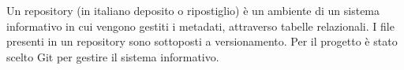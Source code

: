 

{Un repository (in italiano deposito o ripostiglio) è un ambiente di un sistema informativo in cui vengono gestiti i metadati, attraverso tabelle relazionali. I file presenti in un repository sono sottoposti a versionamento. Per il progetto è stato scelto Git per gestire il sistema informativo.}